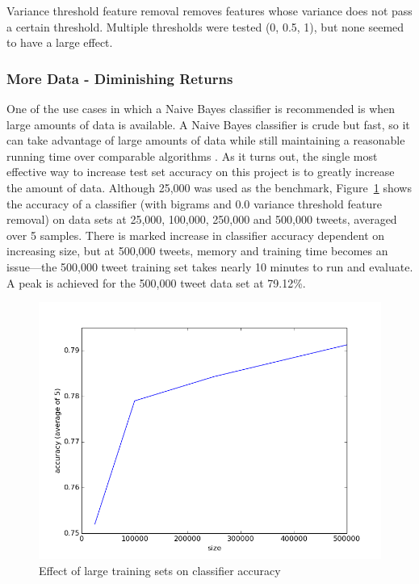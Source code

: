 \documentclass[letter,12pt]{article}
\begin{document}
Variance threshold feature removal removes features whose variance does not
pass a certain threshold. Multiple thresholds were tested (0, 0.5, 1), but none
seemed to have a large effect.



\subsubsection{More Data - Diminishing Returns}
\label{ssub:more_data}

One of the use cases in which a Naive Bayes classifier is recommended is when
large amounts of data is available. A Naive Bayes classifier is crude but fast,
so it can take advantage of large amounts of data while still maintaining a
reasonable running time over comparable algorithms \cite{davis13}. As it turns
out, the single most effective way to increase test set accuracy on this
project is to greatly increase the amount of data. Although 25,000 was used as
the benchmark, Figure~\ref{fig:large_data_sets} shows the accuracy of a
classifier (with bigrams and 0.0 variance threshold feature removal) on data
sets at 25,000, 100,000, 250,000 and 500,000 tweets, averaged over 5 samples.
There is marked increase in classifier accuracy dependent on increasing size,
but at 500,000 tweets, memory and training time becomes an issue---the 500,000
tweet training set takes nearly 10 minutes to run and evaluate. A peak is
achieved for the 500,000 tweet data set at 79.12\%.

\begin{figure}[h]
  \centering
  \includegraphics[width=0.8\linewidth]{img/large_data_sets.png}
  \caption{Effect of large training sets on classifier accuracy}
  \label{fig:large_data_sets}
\end{figure}
\end{document}
